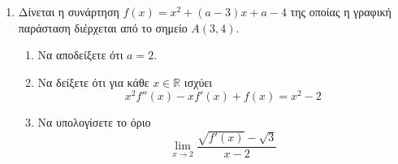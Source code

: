 \begin{enumerate}[leftmargin=0mm]
\item 
Δίνεται η συνάρτηση $ f(x)=x^2+(a-3)x+a-4 $ της οποίας η γραφική παράσταση διέρχεται από το σημείο $ A(3,4) $.
\begin{enumerate}
\item Να αποδείξετε ότι $ a=2 $.
\item Να δείξετε ότι για κάθε $ x\in\mathbb{R} $ ισχύει
\[ x^2f''(x)-xf'(x)+f(x)=x^2-2 \]
\item Να υπολογίσετε το όριο
\[ \lim_{x\to 2}\frac{\sqrt{f'(x)}-\sqrt{3}}{x-2} \]
\end{enumerate}


\end{enumerate}